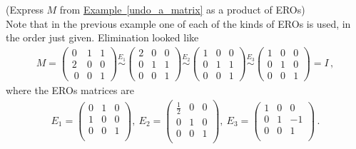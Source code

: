 \begin{example} (Express $M$ from  
\hyperlink{undo a matrix}{Example~\ref{undo_a_matrix}} as a product of EROs)\\
Note that in the previous example 
one of each of the kinds of EROs is used, in the order just given.
Elimination looked like 
\begin{eqnarray*}
M=
\left(\begin{array}{ccc}
0 & 1 & 1 \\ 
2 & 0 & 0 \\\
0& 0 & 1  
\end{array}  \right)
\stackrel{E_1}{\sim}
\left(\begin{array}{ccc}
2 & 0 & 0 \\
0 & 1 & 1 \\ 
0& 0 & 1  
\end{array}  \right)
\stackrel{E_2}{\sim}
\left(\begin{array}{ccc}
1 & 0 & 0 \\
0 & 1 & 1 \\ 
0& 0 & 1  
\end{array}  \right)
\stackrel{E_3}{\sim}
\left(\begin{array}{ccc}
1 & 0 & 0 \\
0 & 1 & 0 \\ 
0& 0 & 1  
\end{array}  \right)
=I\, ,
\end{eqnarray*}
where the EROs matrices are 
\begin{eqnarray*}
E_1
= \left(\begin{array}{ccc}
0  &1 &0\\
1  &0 &0\\ 
0  &0 &1\\
\end{array}  \right)
,~
E_2
= \left(\begin{array}{ccc}
\frac12  &0 &0\\
0  &1 &0\\ 
0  &0 &1\\
\end{array}  \right) , ~
E_3
= \left(\begin{array}{ccc}
1  &0 &0\\
0  &1 & -1\\ 
0  &0 &1\\
\end{array}  \right) \,.
\end{eqnarray*}

\end{example}
